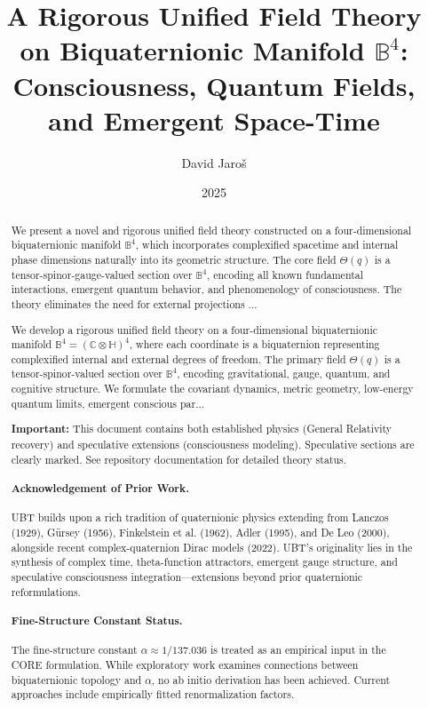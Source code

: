 \documentclass[12pt]{article}
\title{A Rigorous Unified Field Theory on Biquaternionic Manifold \( \mathbb{B}^4 \): Consciousness, Quantum Fields, and Emergent Space-Time}
\author{David Jaroš}
\date{2025}
\begin{document}
\maketitle


\UBTStatusDisclaimer

\begin{abstract}
We present a novel and rigorous unified field theory constructed on a four-dimensional biquaternionic manifold \( \mathbb{B}^4 \), which incorporates complexified spacetime and internal phase dimensions naturally into its geometric structure. The core field \( \Theta(q) \) is a tensor-spinor-gauge-valued section over \( \mathbb{B}^4 \), encoding all known fundamental interactions, emergent quantum behavior, and phenomenology of consciousness. The theory eliminates the need for external projections ...

We develop a rigorous unified field theory on a four-dimensional biquaternionic manifold \( \mathbb{B}^4 = (\mathbb{C} \otimes \mathbb{H})^4 \), where each coordinate is a biquaternion representing complexified internal and external degrees of freedom. The primary field \( \Theta(q) \) is a tensor-spinor-valued section over \( \mathbb{B}^4 \), encoding gravitational, gauge, quantum, and cognitive structure. We formulate the covariant dynamics, metric geometry, low-energy quantum limits, emergent conscious par...

\textbf{Important:} This document contains both established physics (General Relativity recovery) and speculative extensions (consciousness modeling). Speculative sections are clearly marked. See repository documentation for detailed theory status.

\paragraph{Acknowledgement of Prior Work.} UBT builds upon a rich tradition of quaternionic physics extending from Lanczos (1929), Gürsey (1956), Finkelstein et al. (1962), Adler (1995), and De Leo (2000), alongside recent complex-quaternion Dirac models (2022). UBT's originality lies in the synthesis of complex time, theta-function attractors, emergent gauge structure, and speculative consciousness integration—extensions beyond prior quaternionic reformulations.

\paragraph{Fine-Structure Constant Status.} The fine-structure constant $\alpha \approx 1/137.036$ is treated as an empirical input in the CORE formulation. While exploratory work examines connections between biquaternionic topology and $\alpha$, no ab initio derivation has been achieved. Current approaches include empirically fitted renormalization factors.
\end{abstract}
\end{document}
